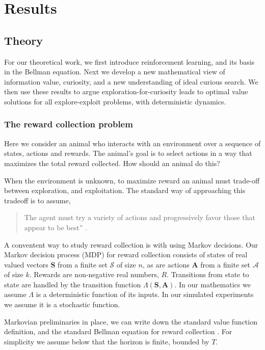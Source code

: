 \section*{Results} 
\subsection*{Theory}
For our theoretical work, we first introduce reinforcement learning, and its basis in the Bellman equation. Next we develop a new mathematical view of information value, curiosity, and a new understanding of ideal curious search. We then use these results to argue exploration-for-curiosity leads to optimal value solutions for all explore-exploit problems, with deterministic dynamics.


\subsubsection*{The reward collection problem}
Here we consider an animal who interacts with an environment over a sequence of states, actions and rewards. The animal's goal is to select actions in a way that maximizes the total reward collected. How should an animal do this? 

When the environment is unknown, to maximize reward an animal must trade-off between exploration, and exploitation. The standard way of approaching this tradeoff is to assume, 

\begin{quote}
The agent must try a variety of actions and progressively favor those that appear to be best'' \cite{Sutton2018}. 
\end{quote}

A conventent way to study reward collection is with using Markov decisions.
Our Markov decision process (MDP) for reward collection consists of states of real valued vectors $\mathbf{S}$ from a finite set $\mathcal{S}$ of size $n$, as are actions $\mathbf{A}$ from a finite set $\mathcal{A}$ of size $k$. Rewards are non-negative real numbers, $R$. Transitions from state to state are handled by the transition function $\Lambda(\mathbf{S},\mathbf{A})$. In our mathematics we assume $\Lambda$ is a deterministic function of its inputs. In our simulated experiments we assume it is a stochastic function.

Markovian preliminaries in place, we can write down the standard value function definition, and the standard Bellman equation \cite{Bellmann1954} for reward collection \cite{Sutton2018}. For simplicity we assume below that the horizon is finite, bounded by $T$.

